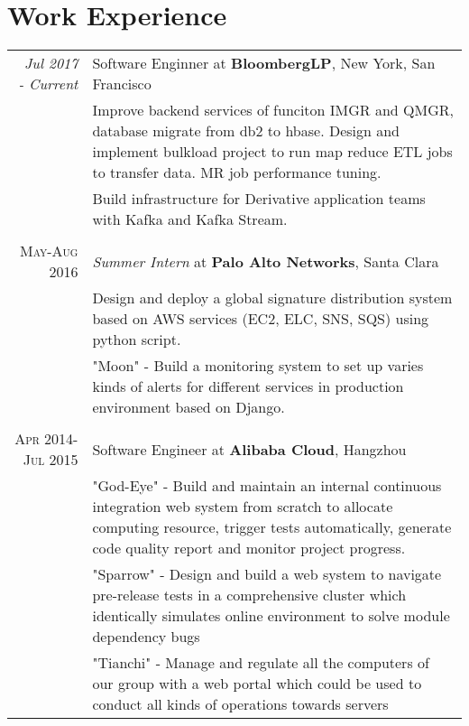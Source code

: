 \documentclass[a4paper,10pt]{article}
\begin{document}
\section{Work Experience}
\begin{tabular}{r|p{11cm}}
  \emph{Jul 2017 - Current} & Software Enginner at \textbf{BloombergLP}, New York, San Francisco\\
  &\footnotesize{Improve backend services of funciton IMGR and QMGR, database migrate from db2 to hbase.
   Design and implement bulkload project to run map reduce ETL jobs to transfer data. MR job performance tuning.}\\
  &\footnotesize{Build infrastructure for Derivative application teams with Kafka and Kafka Stream.
  }\\
  \multicolumn{2}{c}{} \\
  \textsc{May-Aug 2016}&\emph{Summer Intern} at \textbf{Palo Alto Networks}, Santa Clara\\
  &\footnotesize{Design and deploy a global signature distribution system based on AWS services (EC2, ELC, SNS, SQS) using python script.}\\
  &\footnotesize{"Moon" - Build a monitoring system to set up varies kinds of alerts for different services in production environment based on Django.}\\
  \multicolumn{2}{c}{}\\
  \textsc{Apr 2014-Jul 2015} & Software Engineer at \textbf{Alibaba Cloud}, Hangzhou \\
  &\footnotesize{"God-Eye" - Build and maintain an internal continuous integration web system from scratch to allocate computing resource, trigger tests automatically, generate code quality report and monitor project progress.}\\
  &\footnotesize{"Sparrow" - Design and build a web system to navigate pre-release tests in a comprehensive cluster which identically simulates online environment to solve module dependency bugs}\\
  &\footnotesize{"Tianchi" - Manage and regulate all the computers of our group with a web portal which could be used to conduct all kinds of operations towards servers
}\\
\end{tabular}
\end{document}

